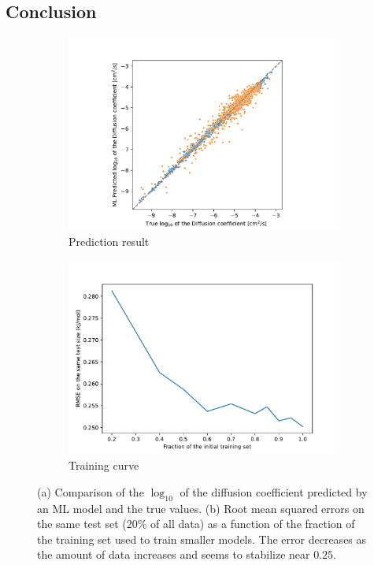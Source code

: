 \documentclass[thesis]{subfiles}
\begin{document}
\begin{otherlanguage}{french}


\section*{Conclusion}

\begin{figure}[ht]
    \centering
    \begin{subfigure}[b]{0.48\textwidth}
      \centering
      \includegraphics[width=\textwidth]{figures/5-diffusion/diffusion_prediction.pdf}
    \caption{Prediction result}\label{fgr:diffusion_pred}
    \end{subfigure}
    \begin{subfigure}[b]{0.48\textwidth}
      \centering
      \includegraphics[width=\textwidth]{figures/5-diffusion/training_curve.pdf}
      \caption{Training curve}\label{fgr:training_curve_diff}
    \end{subfigure}
      \caption{ (a) Comparison of the $\log_{10}$ of the diffusion coefficient predicted by an ML model and the true values. (b) Root mean squared errors on the same test set (20\% of all data) as a function of the fraction of the training set used to train smaller models. The error decreases as the amount of data increases and seems to stabilize near $0.25$. }
  \end{figure}


\end{otherlanguage}
\end{document}
